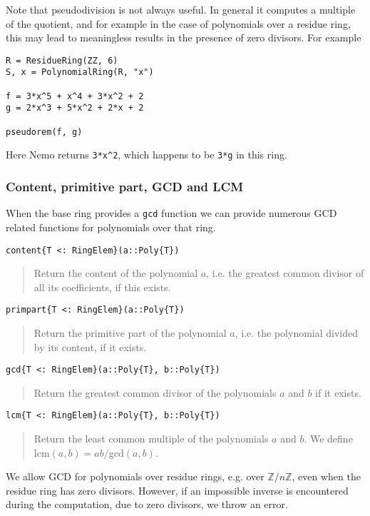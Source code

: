 \documentclass[a4paper,10pt]{article}
\newcommand{\Z}{\mathbb{Z}}
\newcommand{\code}{\lstinline}
\newcommand{\desc}[1]{\vspace{-3mm}\begin{quote}#1\end{quote}}
\begin{document}
Note that pseudodivision is not always useful. In general it computes a
multiple of the quotient, and for example in the case of polynomials over a
residue ring, this may lead to meaningless results in the presence of zero
divisors. For example

\begin{lstlisting}
R = ResidueRing(ZZ, 6)
S, x = PolynomialRing(R, "x")

f = 3*x^5 + x^4 + 3*x^2 + 2
g = 2*x^3 + 5*x^2 + 2*x + 2

pseudorem(f, g)
\end{lstlisting}

Here Nemo returns \code{3*x^2}, which happens to be \code{3*g} in this
ring.

\subsubsection{Content, primitive part, GCD and LCM}

When the base ring provides a \code{gcd} function we can provide numerous
GCD related functions for polynomials over that ring.

\begin{lstlisting}
content{T <: RingElem}(a::Poly{T})
\end{lstlisting}

\desc{Return the content of the polynomial $a$, i.e. the greatest common divisor
of all its coefficients, if this exists.}

\begin{lstlisting}
primpart{T <: RingElem}(a::Poly{T})
\end{lstlisting}

\desc{Return the primitive part of the polynomial $a$, i.e. the polynomial
divided by its content, if it exists.}

\begin{lstlisting}
gcd{T <: RingElem}(a::Poly{T}, b::Poly{T})
\end{lstlisting}

\desc{Return the greatest common divisor of the polynomials $a$ and $b$ if 
it exists.}

\begin{lstlisting}
lcm{T <: RingElem}(a::Poly{T}, b::Poly{T})
\end{lstlisting}

\desc{Return the least common multiple of the polynomials $a$ and $b$. We
define lcm$(a, b) = ab/$gcd$(a, b)$.}

We allow GCD for polynomials over residue rings, e.g. over $\Z/n\Z$, even when
the residue ring has zero divisors. However, if an impossible inverse is
encountered during the computation, due to zero divisors, we throw an error.
\end{document}
